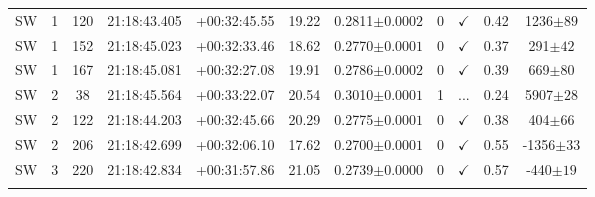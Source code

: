 \begin{landscape}
\begin{longtable}{ccccccccccc}
	SW & 1 & 120 & 21:18:43.405 & +00:32:45.55 & 19.22 & 0.2811$\pm{0.0002}$ & 0 & $\checkmark$ & 0.42 & 1236$\pm{89}$ \\
	SW & 1 & 152 & 21:18:45.023 & +00:32:33.46 & 18.62 & 0.2770$\pm{0.0001}$ & 0 & $\checkmark$ & 0.37 & 291$\pm{42}$ \\
	SW & 1 & 167 & 21:18:45.081 & +00:32:27.08 & 19.91 & 0.2786$\pm{0.0002}$ & 0 & $\checkmark$ & 0.39 & 669$\pm{80}$ \\
	SW & 2 & 38 & 21:18:45.564 & +00:33:22.07 & 20.54 & 0.3010$\pm{0.0001}$ & 1 & ... & 0.24 & 5907$\pm{28}$ \\
	SW & 2 & 122 & 21:18:44.203 & +00:32:45.66 & 20.29 & 0.2775$\pm{0.0001}$ & 0 & $\checkmark$ & 0.38 & 404$\pm{66}$ \\
	SW & 2 & 206 & 21:18:42.699 & +00:32:06.10 & 17.62 & 0.2700$\pm{0.0001}$ & 0 & $\checkmark$ & 0.55 & -1356$\pm{33}$ \\
	SW & 3 & 220 & 21:18:42.834 & +00:31:57.86 & 21.05 & 0.2739$\pm{0.0000}$ & 0 & $\checkmark$ & 0.57 & -440$\pm{19}$ \\
			\hline
		\label{2tbl:c319p70+0p56}
	\end{longtable}
\end{landscape}


